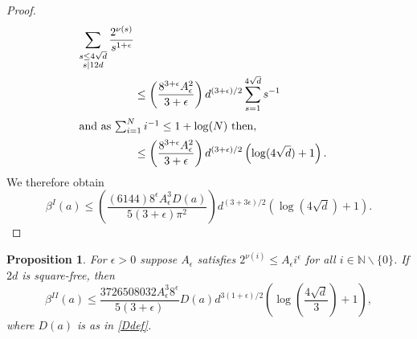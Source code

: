 \documentclass[12pt, a4paper]{article}
\newtheorem{proposition}[thm]{Proposition}
\newcommand{\NN}{\mathbb{N}}
\newcommand{\opn}{\operatorname}
\begin{document}
\begin{proof}
\begin{align*}
    \sum_{\substack{s \leq 4 \sqrt{d} \\ s \mid 12 d }} \frac{2^{ \nu(s)}}{s^{1 + \epsilon}} \\
    & \leq
    \left (
    \frac{8^{3 + \epsilon} A_{\epsilon}^2 }{3 + \epsilon}
    \right )
    d^{(3+\epsilon)/2}
    \sum_{s=1}^{4 \sqrt{d}} s^{-1} \\
\intertext{and as $\sum_{i=1}^N i^{-1} \leq 1 + \opn{log}(N)$ then,}
    & \leq
    \left (
    \frac{8^{3 + \epsilon}A_{\epsilon}^2}{3 + \epsilon}
    \right )
    d^{(3+\epsilon)/2}
    \left ( \opn{log}(4 \sqrt{d}) + 1 \right ).
  \end{align*}
  We therefore obtain
\[ 
    \beta^I(a)
\leq  \left( \frac{(6144)  8^{\epsilon} A_{\epsilon}^3 D(a)}{5(3 + \epsilon) \pi^2} \right )d^{(3+ 3 \epsilon)/2} \left ( \opn{log}(4 \sqrt{d}) + 1 \right ).
    \]
\end{proof}
\begin{proposition}\label{betaIIbound}
  For $\epsilon>0$ suppose  $A_{\epsilon}$ satisfies $2^{\nu(i)} \leq A_{\epsilon} i^{\epsilon}$ for all $i \in \NN \backslash \{0\}$.
  If $2d$ is square-free, then  
  \[
  \beta^{II}(a) \leq
  \frac{3726508032 A_{\epsilon}^3 8^{\epsilon}}{5 (3 + \epsilon)} D(a) d^{3(1+\epsilon)/2} \left ( \opn{log} \left ( \frac{4 \sqrt{d}}{3} \right ) + 1 \right ),
\]
  where $D(a)$ is as in \eqref{Ddef}.
\end{proposition}
\end{document}

